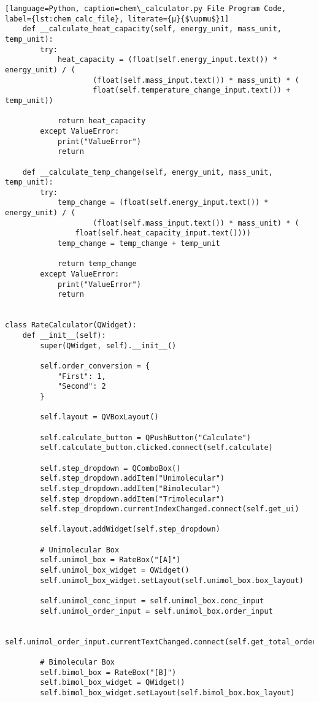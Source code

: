 \begin{lstlisting}[language=Python, caption=chem\_calculator.py File Program Code, label={lst:chem_calc_file}, literate={μ}{$\upmu$}1]
    def __calculate_heat_capacity(self, energy_unit, mass_unit, temp_unit):
        try:
            heat_capacity = (float(self.energy_input.text()) * energy_unit) / (
                    (float(self.mass_input.text()) * mass_unit) * (
                    float(self.temperature_change_input.text()) + temp_unit))

            return heat_capacity
        except ValueError:
            print("ValueError")
            return

    def __calculate_temp_change(self, energy_unit, mass_unit, temp_unit):
        try:
            temp_change = (float(self.energy_input.text()) * energy_unit) / (
                    (float(self.mass_input.text()) * mass_unit) * (
                float(self.heat_capacity_input.text())))
            temp_change = temp_change + temp_unit

            return temp_change
        except ValueError:
            print("ValueError")
            return


class RateCalculator(QWidget):
    def __init__(self):
        super(QWidget, self).__init__()

        self.order_conversion = {
            "First": 1,
            "Second": 2
        }

        self.layout = QVBoxLayout()

        self.calculate_button = QPushButton("Calculate")
        self.calculate_button.clicked.connect(self.calculate)

        self.step_dropdown = QComboBox()
        self.step_dropdown.addItem("Unimolecular")
        self.step_dropdown.addItem("Bimolecular")
        self.step_dropdown.addItem("Trimolecular")
        self.step_dropdown.currentIndexChanged.connect(self.get_ui)

        self.layout.addWidget(self.step_dropdown)

        # Unimolecular Box
        self.unimol_box = RateBox("[A]")
        self.unimol_box_widget = QWidget()
        self.unimol_box_widget.setLayout(self.unimol_box.box_layout)

        self.unimol_conc_input = self.unimol_box.conc_input
        self.unimol_order_input = self.unimol_box.order_input

        self.unimol_order_input.currentTextChanged.connect(self.get_total_order)

        # Bimolecular Box
        self.bimol_box = RateBox("[B]")
        self.bimol_box_widget = QWidget()
        self.bimol_box_widget.setLayout(self.bimol_box.box_layout)


\end{lstlisting}
